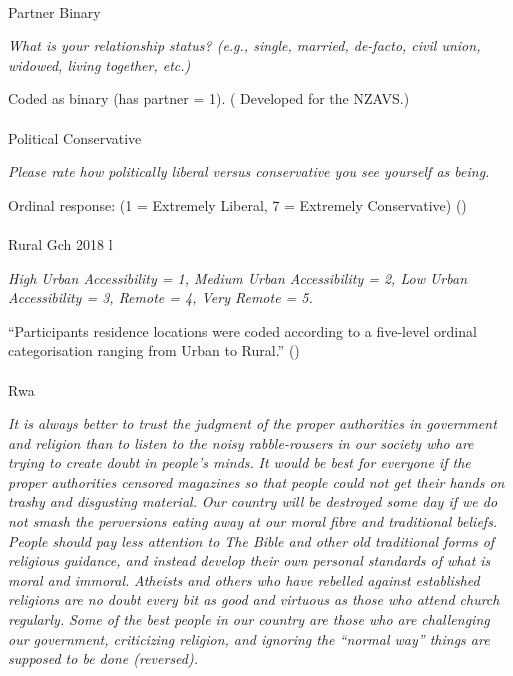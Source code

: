 \documentclass[
  single column]{article}
\makeatletter
\let\oldparagraph\paragraph
\renewcommand{\paragraph}{
    \@ifstar
      \xxxParagraphStar
      \xxxParagraphNoStar
  }
\newcommand{\xxxParagraphStar}[1]{\oldparagraph*{#1}\mbox{}}
\newcommand{\xxxParagraphNoStar}[1]{\oldparagraph{#1}\mbox{}}
\makeatother
\begin{document}
\paragraph{Partner Binary}\label{partner-binary}

\emph{What is your relationship status? (e.g., single, married,
de-facto, civil union, widowed, living together, etc.)}

Coded as binary (has partner = 1).
( Developed for the
NZAVS.)

\paragraph{Political Conservative}\label{political-conservative}

\emph{Please rate how politically liberal versus conservative you see
yourself as being.}

Ordinal response: (1 = Extremely Liberal, 7 = Extremely Conservative)
()

\paragraph{Rural Gch 2018 l}\label{rural-gch-2018-l}

\emph{High Urban Accessibility = 1, Medium Urban Accessibility = 2, Low
Urban Accessibility = 3, Remote = 4, Very Remote = 5.}

``Participants residence locations were coded according to a five-level
ordinal categorisation ranging from Urban to Rural.''
()

\paragraph{Rwa}\label{rwa}

\emph{It is always better to trust the judgment of the proper
authorities in government and religion than to listen to the noisy
rabble-rousers in our society who are trying to create doubt in people's
minds.} \emph{It would be best for everyone if the proper authorities
censored magazines so that people could not get their hands on trashy
and disgusting material.} \emph{Our country will be destroyed some day
if we do not smash the perversions eating away at our moral fibre and
traditional beliefs.} \emph{People should pay less attention to The
Bible and other old traditional forms of religious guidance, and instead
develop their own personal standards of what is moral and immoral.}
\emph{Atheists and others who have rebelled against established
religions are no doubt every bit as good and virtuous as those who
attend church regularly.} \emph{Some of the best people in our country
are those who are challenging our government, criticizing religion, and
ignoring the ``normal way'' things are supposed to be done (reversed).}
\end{document}
